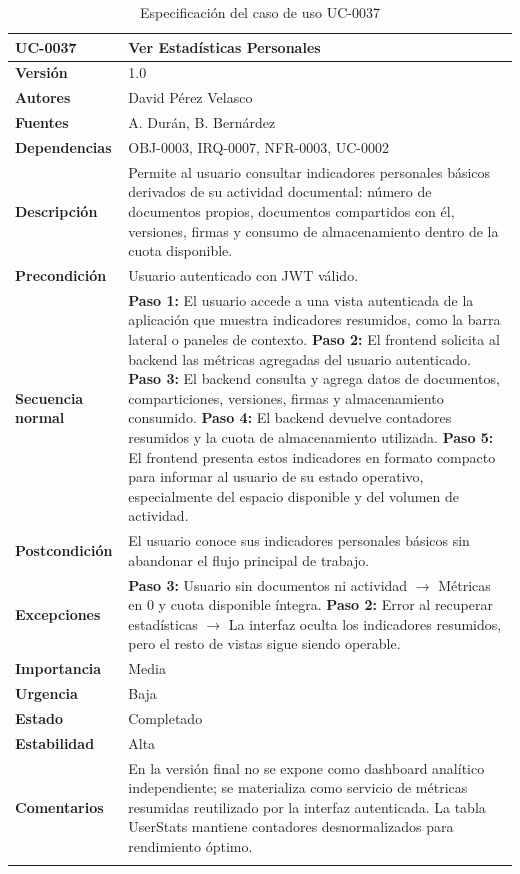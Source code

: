 \documentclass[11pt, a4paper]{article}
\begin{document}
\begin{longtable}{|p{4cm}|p{10cm}|}
\hline
\textbf{UC-0037} & Ver Estadísticas Personales \\
\hline
\textbf{Versión} & 1.0 \\
\hline
\textbf{Autores} & David Pérez Velasco \\
\hline
\textbf{Fuentes} & A. Durán, B. Bernárdez \\
\hline
\textbf{Dependencias} & OBJ-0003, IRQ-0007, NFR-0003, UC-0002 \\
\hline
\textbf{Descripción} & Permite al usuario consultar indicadores personales básicos derivados de su actividad documental: número de documentos propios, documentos compartidos con él, versiones, firmas y consumo de almacenamiento dentro de la cuota disponible. \\
\hline
\textbf{Precondición} & Usuario autenticado con JWT válido. \\
\hline
\textbf{Secuencia normal} &
\textbf{Paso 1:} El usuario accede a una vista autenticada de la aplicación que muestra indicadores resumidos, como la barra lateral o paneles de contexto.\newline
\textbf{Paso 2:} El frontend solicita al backend las métricas agregadas del usuario autenticado.\newline
\textbf{Paso 3:} El backend consulta y agrega datos de documentos, comparticiones, versiones, firmas y almacenamiento consumido.\newline
\textbf{Paso 4:} El backend devuelve contadores resumidos y la cuota de almacenamiento utilizada.\newline
\textbf{Paso 5:} El frontend presenta estos indicadores en formato compacto para informar al usuario de su estado operativo, especialmente del espacio disponible y del volumen de actividad.\\
\hline
\textbf{Postcondición} & El usuario conoce sus indicadores personales básicos sin abandonar el flujo principal de trabajo. \\
\hline
\textbf{Excepciones} &
\textbf{Paso 3:} Usuario sin documentos ni actividad $\rightarrow$ Métricas en 0 y cuota disponible íntegra.\newline
\textbf{Paso 2:} Error al recuperar estadísticas $\rightarrow$ La interfaz oculta los indicadores resumidos, pero el resto de vistas sigue siendo operable.\\
\hline
\textbf{Importancia} & Media \\
\hline
\textbf{Urgencia} & Baja \\
\hline
\textbf{Estado} & Completado \\
\hline
\textbf{Estabilidad} & Alta \\
\hline
\textbf{Comentarios} & En la versión final no se expone como dashboard analítico independiente; se materializa como servicio de métricas resumidas reutilizado por la interfaz autenticada. La tabla UserStats mantiene contadores desnormalizados para rendimiento óptimo. \\
\hline
\caption{Especificación del caso de uso UC-0037}
\end{longtable}
\end{document}
